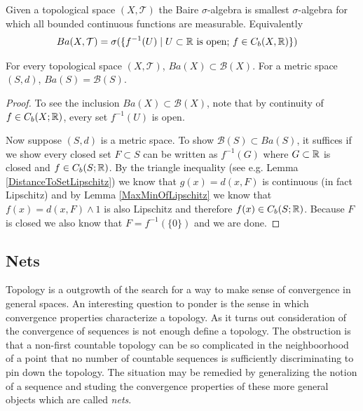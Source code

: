 \begin{defn}Given a topological space $(X, \mathcal{T})$ the Baire
  $\sigma$-algebra is smallest $\sigma$-algebra for which all bounded
  continuous functions are measurable.  Equivalently 
\begin{align*}
Ba(X,\mathcal{T}) &= \sigma(\lbrace f^{-1}(U) \mid U \subset \mathbb{R}
\text{ is open; } f \in C_b(X,\mathbb{R})\rbrace)
\end{align*}
\end{defn}
\begin{lem}For every topological space $(X, \mathcal{T})$, $Ba(X)
  \subset \mathcal{B}(X)$.  For a metric space $(S,d)$, $Ba(S) = \mathcal{B}(S)$.
\end{lem}
\begin{proof}
To see the inclusion $Ba(X)
  \subset \mathcal{B}(X)$, note that by continuity of $f \in
  C_b(X;\mathbb{R})$, every set $f^{-1}(U)$ is open.

Now suppose $(S,d)$ is a metric space.  To show $\mathcal{B}(S)
\subset Ba(S)$, it suffices if we show every closed set $F \subset S$
can be written as $f^{-1}(G)$ where $G \subset \mathbb{R}$ is closed and
$f \in C_b(S; \mathbb{R})$.  By the triangle inequality (see e.g. Lemma
\ref{DistanceToSetLipschitz}) we know
that $g(x) = d(x, F)$ is continuous (in fact Lipschitz) and by Lemma
\ref{MaxMinOfLipschitz} we know that $f(x) = d(x, F) \wedge 1$ is also
Lipschitz and therefore $f(x) \in C_b(S; \mathbb{R})$.  Because $F$ is
closed we also know that $F = f^{-1}(\lbrace 0 \rbrace)$ and we are done.
\end{proof}

\subsection{Nets}

Topology is a outgrowth of the search for a way to make sense
of convergence in general spaces.  An interesting question to ponder is the sense in which 
convergence properties characterize a topology.  As it turns out consideration of the convergence of
sequences is not enough define a topology.  The obstruction is that a non-first countable topology can
be so complicated in the neighboorhood of a point that no number of countable sequences is sufficiently discriminating
to pin down the topology.  The situation may be remedied by generalizing the notion of a sequence and studing the
convergence properties of these more general objects which are called \emph{nets}.

